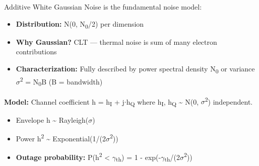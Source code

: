 
Additive White Gaussian Noise is the fundamental noise model:

\begin{itemize}
\tightlist
\item
  \textbf{Distribution:} N(0, N\textsubscript{0}/2) per dimension
\item
  \textbf{Why Gaussian?} CLT — thermal noise is sum of many electron contributions
\item
  \textbf{Characterization:} Fully described by power spectral density N\textsubscript{0} or variance \ensuremath{\sigma}\textsuperscript{2} = N\textsubscript{0}B (B = bandwidth)
\end{itemize}


\textbf{Model:} Channel coefficient h = h\textsubscript{I} + j\ensuremath{\cdot}h\textsubscript{Q} where h\textsubscript{I}, h\textsubscript{Q} \textasciitilde{} N(0, \ensuremath{\sigma}\textsuperscript{2}) independent.

\begin{itemize}
\tightlist
\item
  Envelope \textbar{}h\textbar{} \textasciitilde{} Rayleigh(\ensuremath{\sigma})
\item
  Power \textbar{}h\textbar{}\textsuperscript{2} \textasciitilde{} Exponential(1/(2\ensuremath{\sigma}\textsuperscript{2}))
\item
  \textbf{Outage probability:} P(\textbar{}h\textbar{}\textsuperscript{2} \textless{} \ensuremath{\gamma}\textsubscript{th}) = 1 - exp(-\ensuremath{\gamma}\textsubscript{th}/(2\ensuremath{\sigma}\textsuperscript{2}))
\end{itemize}


